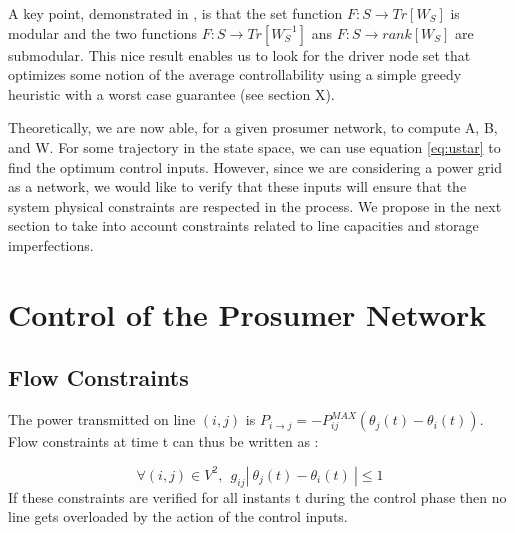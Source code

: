 \documentclass[conference]{IEEEtran}
\begin{document}
A key point, demonstrated in \cite{Summers2014}, is that the set function $ F:S \longrightarrow Tr[W_S] $ is modular and the two functions $F:S \longrightarrow Tr[W^{-1}_S] $ ans $ F:S \longrightarrow rank[W_S] $ are submodular. This nice result enables us to look for the driver node set that optimizes some notion of the average controllability using a simple greedy heuristic with a worst case guarantee (see section X).

Theoretically, we are now able, for a given prosumer network, to compute A, B, and W. For some trajectory in the state space, we can use equation \ref{eq:ustar} to find the optimum control inputs. However, since we are considering a power grid as a network, we would like to verify that these inputs will ensure that the system physical constraints are respected in the process. We propose in the next section to take into account constraints related to line capacities and storage imperfections.

\section{Control of the Prosumer Network}
\label{sec:Control_prosumer}



\subsection{Flow Constraints}

The power transmitted on line $ (i,j)$ is $ P_{i \longrightarrow j} = -P_{ij}^{MAX} \left( \theta_j(t) - \theta_i(t) \right) $. Flow constraints at time t can thus be written as :

\begin{equation}
\label{eq:flow_cons}
\forall (i,j) \in V^2,\ \ g_{ij} \left|\ \theta_j(t) - \theta_i(t)\ \right| \leq 1
\end{equation}
If these constraints are verified for all instants t during the control phase then no line gets overloaded by the action of the control inputs. 
\end{document}
